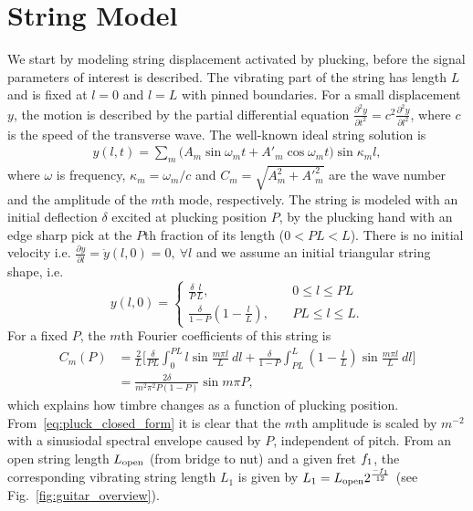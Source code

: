 \documentclass{article}
\begin{document}
\section{String Model} %
\label{sec:signal_model}
\vspace{-.6mm}
We start by modeling string displacement activated by plucking, before the signal parameters of interest is described. 
The vibrating part of the string has length $L$ and is fixed at $l=0$ and $l=L$ with pinned boundaries. %
For a small displacement $y$, the motion is described by the partial differential equation $\frac{\partial^2 y}{\partial t^2} = c^2\frac{\partial^2 y}{\partial l^2}$, where $c$ is the speed of the transverse wave. The well-known ideal string solution is ~\cite{fletcher:principles_of_vibration_and_sound}
\begin{align}
     y(l,t) = \sum_m \big(A_m \sin{\omega_mt} + A'_m \cos{\omega_mt}\big) \sin{\kappa_ml},
\end{align}
%
where $\omega$ is frequency, $\kappa_m=\omega_m/c$ and $C_m\!\!=\!\!\sqrt{A_m^2\!+\!{A'}_m^2}$ are the wave number and the amplitude of the $m$th mode, respectively. 
%
The string is modeled with an initial deflection $\delta$ excited at plucking position $P$, by the plucking hand with an edge sharp pick at the $P$th fraction of its length ($0\!\! <\!\! PL\!\! <\!\! L$). There is no initial velocity i.e. $ \frac{\partial y}{\partial l} \!\!= \!\dot{y}(l,0)\!=0, \  \forall l$ and we assume an initial triangular string shape, i.e. 
\begin{equation}
     y(l,0) =\begin{cases}
               \frac{\delta}{P}\frac{l}{L}, \quad & 0\leq l \leq PL\\
               \frac{\delta}{1\!-\!P}(1\!-\!\frac{l}{L}),        \quad & PL\leq l \leq L. 
            \end{cases}\label{eq:string_initialization}
\end{equation}
For a fixed $P$, the $m$th Fourier coefficients of this string is 
\begin{align}
    C_m(P) \!\! &= \!\! \frac{2}{L}\bigg[\! \frac{\delta}{PL} \! \int_0^{PL}\!\!\!\!\!\!\!\!\! l \sin{\!\frac{m\pi l\!}{L}}\:\! dl\! 
        + \!\frac{\delta}{1\!-\!P}\!\!\! \int_{PL}^L \!\!\!(1\!-\!\frac{l}{L}) \sin{\! \frac{m\pi l\!}{L}}\:\! dl \bigg]\nonumber \\
        &= \frac{2\delta}{m^2 \pi^2 P(1-P)} \sin{m \pi P }, \label{eq:pluck_closed_form}
\end{align}
which explains how timbre changes as a function of plucking position. From~\eqref{eq:pluck_closed_form} it is clear that the $m$th amplitude is scaled by $m^{-2}$ with a sinusiodal spectral envelope caused by $P$, independent of pitch. From an open string length $L_{\textup{open}}$ (from bridge to nut) and a given fret $f_1$, the corresponding vibrating string length $L_1$ is given by $L_1 = L_{\textup{open}}  2^\frac{-f_1}{12}$ (see Fig.~\ref{fig:guitar_overview}).
\end{document}
